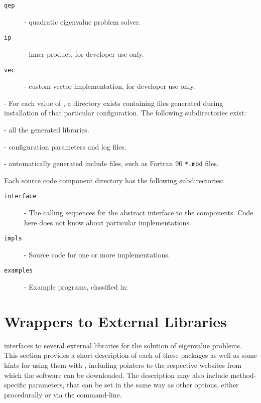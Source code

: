 \begin{description}
\begin{description}
\item[\texttt{qep}] - quadratic eigenvalue problem solver.
\item[\texttt{ip}] - inner product, for developer use only.
\item[\texttt{vec}] - custom vector implementation, for developer use only.
\end{description}
\item[\texttt{\$PETSC\_ARCH}] - For each value of , a directory exists containing files generated during installation of that particular configuration. The following subdirectories exist:
\begin{description}
\setlength{\itemsep}{0mm}
\item[\texttt{lib}] - all the generated libraries.
\item[\texttt{conf}] - configuration parameters and log files.
\item[\texttt{include}] - automatically generated include files, such as Fortran 90 \texttt{*.mod} files.
\end{description}
\end{description}

Each \slepc source code component directory has the following subdirectories:
\begin{description}
\item[\texttt{interface}] - The calling sequences for the abstract interface to the components. Code here does not know about particular implementations.
\item[\texttt{impls}] - Source code for one or more implementations.
\item[\texttt{examples}] - Example programs, classified in:
\end{description}

\section{Wrappers to External Libraries}
\label{sec:wrap}

	\slepc interfaces to several external libraries for the solution of eigenvalue problems. This section provides a short description of each of these packages as well as some hints for using them with \slepc, including pointers to the respective websites from which the software can be downloaded. The description may also include method-specific parameters, that can be set in the same way as other \slepc options, either procedurally or via the command-line.


